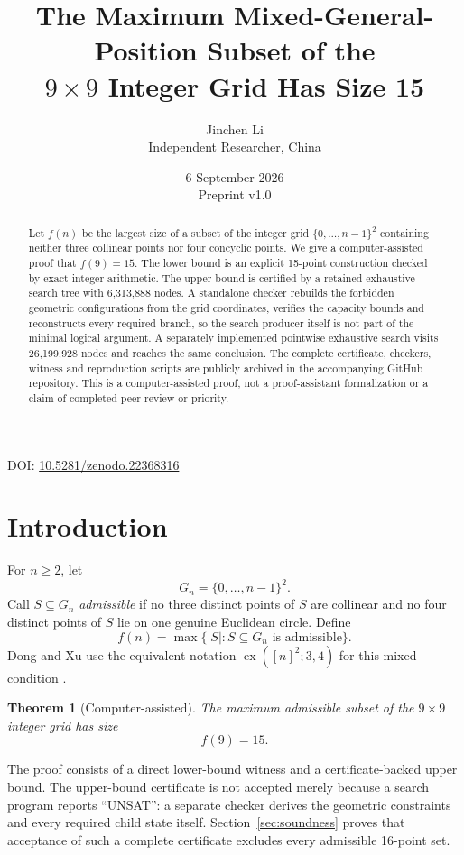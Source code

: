 \documentclass[11pt,a4paper]{article}
\title{The Maximum Mixed-General-Position Subset of the\\$9\times9$ Integer Grid Has Size 15}
\author{Jinchen Li\\\small Independent Researcher, China}
\date{6 September 2026\\[2pt]\small Preprint v1.0}
\newtheorem{theorem}{Theorem}[section]
\theoremstyle{definition}
\theoremstyle{remark}
\newcommand{\Gn}{G_n}
\begin{document}
\maketitle
\begin{center}
\small DOI: \href{https://doi.org/10.5281/zenodo.22368316}{10.5281/zenodo.22368316}
\end{center}

\begin{abstract}
Let $f(n)$ be the largest size of a subset of the integer grid
$\{0,\ldots,n-1\}^2$ containing neither three collinear points nor four
concyclic points. We give a computer-assisted proof that $f(9)=15$.
The lower bound is an explicit 15-point construction checked by exact integer
arithmetic. The upper bound is certified by a retained exhaustive search tree
with 6,313,888 nodes. A standalone checker rebuilds the forbidden geometric
configurations from the grid coordinates, verifies the capacity bounds and
reconstructs every required branch, so the search producer itself is not part
of the minimal logical argument. A separately implemented pointwise exhaustive
search visits 26,199,928 nodes and reaches the same conclusion. The complete
certificate, checkers, witness and reproduction scripts are publicly archived
in the accompanying GitHub repository. This is a computer-assisted proof, not
a proof-assistant formalization or a claim of completed peer review or priority.
\end{abstract}

\section{Introduction}
For $n\ge2$, let
\[
  \Gn=\{0,\ldots,n-1\}^2.
\]
Call $S\subseteq\Gn$ \emph{admissible} if no three distinct points of $S$
are collinear and no four distinct points of $S$ lie on one genuine Euclidean
circle. Define
\[
  f(n)=\max\{|S|:S\subseteq\Gn\text{ is admissible}\}.
\]
Dong and Xu use the equivalent notation $\operatorname{ex}([n]^2;3,4)$ for
this mixed condition \cite{dongxu2025}.

\begin{theorem}[Computer-assisted]\label{thm:main}
The maximum admissible subset of the $9\times9$ integer grid has size
\[
  \boxed{f(9)=15}.
\]
\end{theorem}

The proof consists of a direct lower-bound witness and a certificate-backed
upper bound. The upper-bound certificate is not accepted merely because a
search program reports ``UNSAT'': a separate checker derives the geometric
constraints and every required child state itself. Section~\ref{sec:soundness}
proves that acceptance of such a complete certificate excludes every
admissible 16-point set.
\end{document}
